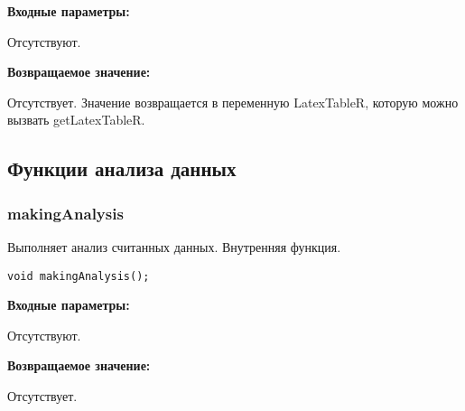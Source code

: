 \documentclass[a4paper,12pt]{article}
\begin{document}
\textbf{Входные параметры:}

Отсутствуют.

\textbf{Возвращаемое значение:}

Отсутствует. Значение возвращается в переменную LatexTableR, которую можно вызвать getLatexTableR.


\subsection{Функции анализа данных}

\subsubsection{makingAnalysis}\label{makingAnalysis}

Выполняет анализ считанных данных. Внутренняя функция.


\begin{lstlisting}[label=code_syntax_makingAnalysis,caption=Синтаксис]
void makingAnalysis();
\end{lstlisting}

\textbf{Входные параметры:}

Отсутствуют.

\textbf{Возвращаемое значение:}

Отсутствует.
\end{document}

